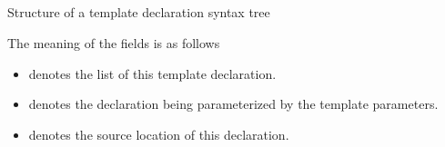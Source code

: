 \subsection{}
\label{sec:ifc:SyntaxSort:TemplateDeclaration}

\begin{Structure}
	\caption{Structure of a template declaration syntax tree}
	\label{fig:ifc:SyntaxSort:TemplateDeclaration}
\end{Structure}
%
The meaning of the fields is as follows
\begin{itemize}
	\item {} denotes the  list of this template declaration.
	\item {} denotes the declaration being parameterized by the template parameters.
	\item {} denotes the source location of this declaration.
\end{itemize}



\subsection{}
\label{sec:ifc:SyntaxSort:RequiresClause}

\begin{Structure}
	\label{fig:ifc:SyntaxSort:RequiresClause}
\end{Structure}



\subsection{}
\label{sec:ifc:SyntaxSort:SimpleRequirement}

\begin{Structure}
	\label{fig:ifc:SyntaxSort:SimpleRequirement}
\end{Structure}

